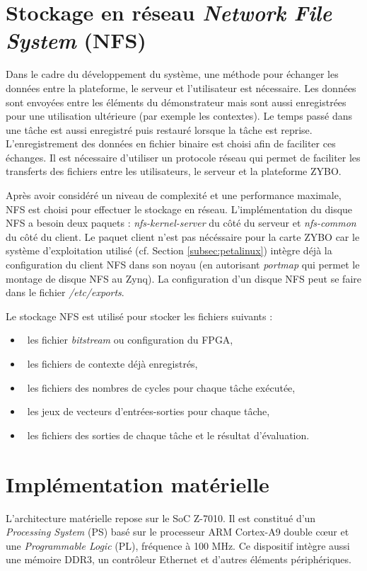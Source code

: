 \section{Stockage en réseau \emph{Network File System} (NFS)}
\label{sec:nfs}
Dans le cadre du développement du système, une méthode pour échanger les données 
entre la plateforme, le serveur et l'utilisateur est nécessaire.
Les données sont envoyées entre les éléments du démonstrateur mais sont aussi enregistrées pour une utilisation ultérieure 
(par exemple les contextes). Le temps passé dans une tâche est aussi enregistré puis restauré lorsque la tâche est reprise.
L'enregistrement des données en fichier binaire est choisi afin de faciliter ces échanges.
Il est nécessaire d'utiliser un protocole réseau qui permet de faciliter les transferts des fichiers entre les utilisateurs,
le serveur et la plateforme ZYBO.

Après  avoir considéré un niveau de complexité et une performance maximale, NFS
est choisi pour effectuer le stockage en réseau.
L'implémentation du disque NFS a besoin deux paquets : \emph{nfs-kernel-server} du côté du serveur et \emph{nfs-common} du côté du client.
Le paquet client n'est pas nécéssaire pour la carte ZYBO car le système d'exploitation utilisé (cf. Section \ref{subsec:petalinux}) intègre déjà la configuration du client NFS 
dans son noyau (en autorisant \emph{portmap} qui permet le montage de disque NFS au Zynq). 
La configuration d'un disque NFS peut se faire dans le fichier \emph{/etc/exports}.

Le stockage NFS est utilisé pour stocker les fichiers suivants :
\begin{itemize}
	\item\ les fichier \emph{bitstream} ou configuration du FPGA,
	\item\ les fichiers de contexte déjà enregistrés,
	\item\ les fichiers des nombres de cycles pour chaque tâche exécutée,
	\item\ les jeux de vecteurs d'entrées-sorties pour chaque tâche,
	\item\ les fichiers des sorties de chaque tâche et le résultat d'évaluation.
\end{itemize}

\section{Implémentation matérielle}
\label{sec:materiel}
L'architecture matérielle repose sur le SoC Z-7010. Il est constitué d'un \emph{Processing System} (PS) 
basé sur le processeur ARM Cortex-A9 double cœur et une \emph{Programmable Logic} (PL), 
fréquence à 100 MHz. Ce dispositif intègre aussi une mémoire DDR3,
un contrôleur Ethernet et d'autres éléments périphériques. 

